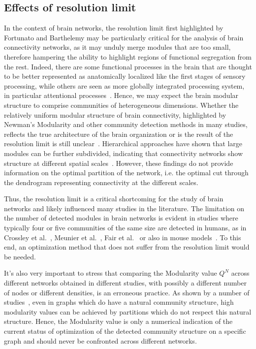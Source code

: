 \subsection{Effects of resolution limit}
In the context of brain networks, the resolution limit first highlighted by Fortunato and Barthelemy may be particularly critical for the analysis of brain connectivity networks, as it may unduly merge modules that are too small, therefore hampering the ability to highlight regions of functional segregation from the rest. Indeed, there are some functional processes in the brain that are thought to be better represented as anatomically localized like the first stages of sensory processing, while others are seen as more globally integrated processing system, in particular attentional processes~\cite{alnaes2015}.
Hence, we may expect the brain modular structure to comprise communities of heterogeneous dimensions.
Whether the relatively uniform modular structure of brain connectivity, highlighted by Newman's Modularity and other community detection methods in many studies, reflects the true architecture of the brain organization or is the result of the resolution limit is still unclear~\cite{nicolini2016}.
Hierarchical approaches have shown that large modules can be further subdivided, indicating that connectivity networks show structure at different spatial scales~\cite{meunier2009}.
However, these findings do not provide information on the optimal partition of the network, i.e. the optimal cut through the dendrogram representing connectivity at the different scales.

Thus, the resolution limit is a critical shortcoming for the study of brain networks and likely influenced many studies in the literature.
The limitation on the number of detected modules in brain networks is evident in studies where typically four or five communities of the same size are detected in humans, as in Crossley et al.~\cite{crossley2013a}, Meunier et al.~\cite{meunier2009a,meunier2010}, Fair et al.~\cite{fair2009} or also in mouse models~\cite{schwarz2008}.
To this end, an optimization method that does not suffer from the resolution limit would be needed.

It's also very important to stress that comparing the Modularity value $Q^N$ across different networks obtained in different studies, with possibly a different number of nodes or different densities, is an erroneous practice.
As shown by a number of studies~\cite{good2009,kehagias2013,radicchi2010}, even in graphs which do have a natural community structure, high modularity values can be achieved by partitions which do not respect this natural structure.
Hence, the Modularity value is only a numerical indication of the current status of optimization of the detected community structure on a specific graph and should never be confronted across different networks.

